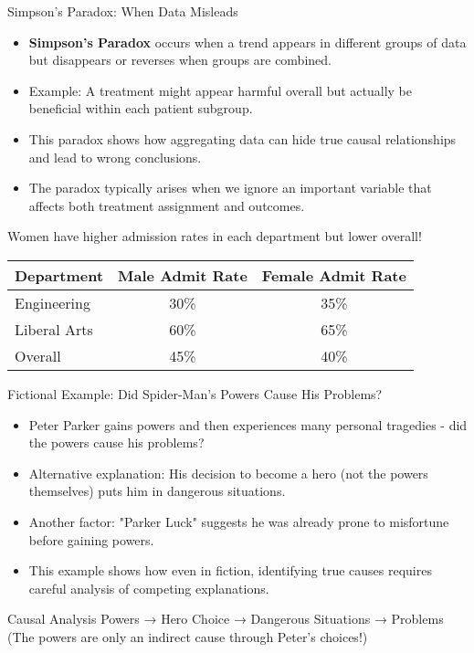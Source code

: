\documentclass{beamer}
\begin{document}
	\begin{frame}{Simpson's Paradox: When Data Misleads}
		\begin{itemize}
			\item \textbf{Simpson's Paradox} occurs when a trend appears in different groups of data but disappears or reverses when groups are combined.
			\item Example: A treatment might appear harmful overall but actually be beneficial within each patient subgroup.
			\item This paradox shows how aggregating data can hide true causal relationships and lead to wrong conclusions.
			\item The paradox typically arises when we ignore an important variable that affects both treatment assignment and outcomes.
		\end{itemize}
		
		\begin{example}
			\small{Women have higher admission rates in each department but lower overall!}
			\\
			\begin{tabular}{l|c|c}
				Department & Male Admit Rate & Female Admit Rate \\
				\hline
				Engineering & 30\% & 35\% \\
				Liberal Arts & 60\% & 65\% \\
				\hline
				Overall & 45\% & 40\% \\
			\end{tabular}
			
		\end{example}
	\end{frame}
	
	\begin{frame}{Fictional Example: Did Spider-Man's Powers Cause His Problems?}
		\begin{itemize}
			\item Peter Parker gains powers and then experiences many personal tragedies - did the powers cause his problems?
			\item Alternative explanation: His decision to become a hero (not the powers themselves) puts him in dangerous situations.
			\item Another factor: "Parker Luck" suggests he was already prone to misfortune before gaining powers.
			\item This example shows how even in fiction, identifying true causes requires careful analysis of competing explanations.
		\end{itemize}
		
		\begin{alertblock}{Causal Analysis}
			Powers → Hero Choice → Dangerous Situations → Problems\\
			(The powers are only an indirect cause through Peter's choices!)
		\end{alertblock}
	\end{frame}
	
\end{document}
